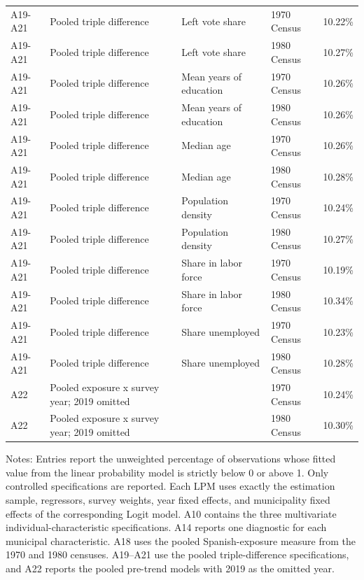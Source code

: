 \begin{longtable}{p{}p{}p{}p{}r}
A19-A21 & Pooled triple difference & Left vote share & 1970 Census & 10.22\% \\
A19-A21 & Pooled triple difference & Left vote share & 1980 Census & 10.27\% \\
A19-A21 & Pooled triple difference & Mean years of education & 1970 Census & 10.26\% \\
A19-A21 & Pooled triple difference & Mean years of education & 1980 Census & 10.26\% \\
A19-A21 & Pooled triple difference & Median age & 1970 Census & 10.26\% \\
A19-A21 & Pooled triple difference & Median age & 1980 Census & 10.28\% \\
A19-A21 & Pooled triple difference & Population density & 1970 Census & 10.24\% \\
A19-A21 & Pooled triple difference & Population density & 1980 Census & 10.27\% \\
A19-A21 & Pooled triple difference & Share in labor force & 1970 Census & 10.19\% \\
A19-A21 & Pooled triple difference & Share in labor force & 1980 Census & 10.34\% \\
A19-A21 & Pooled triple difference & Share unemployed & 1970 Census & 10.23\% \\
A19-A21 & Pooled triple difference & Share unemployed & 1980 Census & 10.28\% \\
\addlinespace
A22 & Pooled exposure x survey year; 2019 omitted &  & 1970 Census & 10.24\% \\
A22 & Pooled exposure x survey year; 2019 omitted &  & 1980 Census & 10.30\% \\
\hline
\end{longtable}
\begin{minipage}{0.98\textwidth}
\footnotesize Notes: Entries report the unweighted percentage of observations whose fitted value from the linear probability model is strictly below 0 or above 1. Only controlled specifications are reported. Each LPM uses exactly the estimation sample, regressors, survey weights, year fixed effects, and municipality fixed effects of the corresponding Logit model. A10 contains the three multivariate individual-characteristic specifications. A14 reports one diagnostic for each municipal characteristic. A18 uses the pooled Spanish-exposure measure from the 1970 and 1980 censuses. A19--A21 use the pooled triple-difference specifications, and A22 reports the pooled pre-trend models with 2019 as the omitted year.
\end{minipage}

